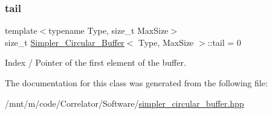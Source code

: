 \subsubsection{\texorpdfstring{tail}{tail}}
{\footnotesize\ttfamily template$<$typename Type, size\+\_\+t Max\+Size$>$ \\
size\+\_\+t \hyperlink{classSimpler__Circular__Buffer}{Simpler\+\_\+\+Circular\+\_\+\+Buffer}$<$ Type, Max\+Size $>$\+::tail = 0\hspace{0.3cm}{\ttfamily [private]}}



Index / Pointer of the first element of the buffer. 



The documentation for this class was generated from the following file\+:\begin{DoxyCompactItemize}
\item 
/mnt/m/code/\+Correlator/\+Software/\hyperlink{simpler__circular__buffer_8hpp}{simpler\+\_\+circular\+\_\+buffer.\+hpp}\end{DoxyCompactItemize}
